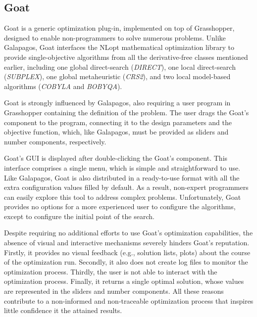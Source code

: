 	\subsection{Goat}
	Goat is a generic optimization plug-in, implemented on top of Grasshopper, designed to enable non-programmers to solve numerous problems.
	Unlike Galapagos, Goat interfaces the NLopt mathematical optimization library to provide single-objective algorithms from all the derivative-free classes mentioned earlier, including one global direct-search (\textit{DIRECT}), one local direct-search (\textit{SUBPLEX}), one global metaheuristic (\textit{CRS2}), and two local model-based algorithms (\textit{\ac{COBYLA}} and \textit{\ac{BOBYQA}}). 
	
	Goat is strongly influenced by Galapagos, also requiring a user program in Grasshopper containing the definition of the problem. The user drags the Goat's component to the program, connecting it to the design parameters and the objective function, which, like Galapagos, must be provided as sliders and number components, respectively.
	
	Goat's \ac{GUI} is displayed after double-clicking the Goat's component. This interface comprises a single menu, which is simple and straightforward to use. Like Galapagos, Goat is also distributed in a ready-to-use format with all the extra configuration values filled by default. As a result, non-expert programmers can easily explore this tool to address complex problems. Unfortunately, Goat provides no options for a more experienced user to configure the algorithms, except to configure the initial point of the search.
	
	Despite requiring no additional efforts to use Goat's optimization capabilities, the absence of visual and interactive mechanisms severely hinders Goat's reputation. Firstly, it provides no visual feedback (e.g., solution lists, plots) about the course of the optimization run. Secondly, it also does not create log files to monitor the optimization process. Thirdly, the user is not able to interact with the optimization process. Finally, it returns a single optimal solution, whose values are represented in the sliders and number components. All these reasons contribute to a non-informed and non-traceable optimization process that inspires little confidence it the attained results. 
	
	
